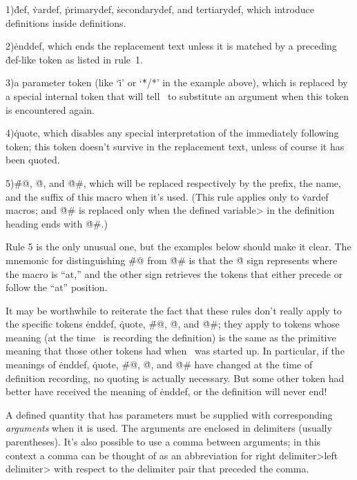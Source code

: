 \smallskip\item{1)}\.{def}, \.{vardef}, \.{primarydef}, \.{secondarydef},
and \.{tertiarydef}, which introduce definitions inside definitions.

\item{2)}\.{enddef}, which ends the replacement text unless it is matched
by a preceding \.{def}-like token as listed in rule~1.

\item{3)}a parameter token (like `\.i' or `\.{*/*}' in the example above),
which is replaced by a special internal token that will tell \MF\ to
substitute an argument when this token is encountered again.

\item{4)}\.{quote}, which disables any special interpretation of the
immediately following token; this token doesn't survive in the
replacement text, unless of course it has been quoted.

\item{5)}\.{\#@}, \.@, and \.{@\#}, which will be replaced respectively by
the prefix, the name, and the suffix of this macro when it's used.
(This rule applies only to \.{vardef} macros; and \.{@\#} is replaced only
when the \<defined variable> in the definition heading ends with \.{@\#}.)

\smallskip\noindent
Rule 5 is the only unusual one, but the examples below should make it clear.
The mnemonic for distinguishing \.{\#@} from \.{@\#} is that the \.@ sign
represents where the macro is ``at,'' and the other sign retrieves the
tokens that either precede or follow the ``at'' position.

It may be worthwhile to reiterate the fact that these rules don't
really apply to the specific tokens \.{enddef}, \.{quote}, \.{\#@}, \.@, and
\.{@\#}; they apply to tokens whose meaning (at the time \MF\ is
recording the definition) is the same as the primitive meaning that those
other tokens had when \MF\ was started up. In particular, if the meanings
of \.{enddef}, \.{quote}, \.{\#@}, \.@, and \.{@\#} have changed at the time of
definition recording, no quoting is actually necessary. But some other
token had better have received the meaning of \.{enddef}, or the definition
will never end!

A defined quantity that has parameters must be supplied with corresponding
{\sl arguments\/} when it is used.  The arguments are enclosed in
delimiters (usually parentheses). It's also possible to use a comma
between arguments; in this context a comma can be thought of as an
abbreviation for \<right delimiter>\<left delimiter> with respect to the
delimiter pair that preceded the comma.

